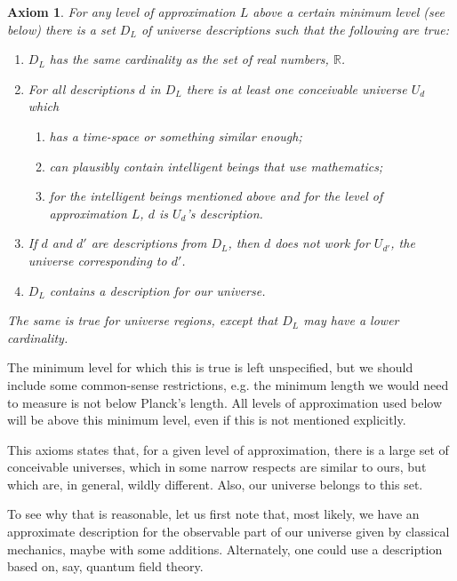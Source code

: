 \documentclass[a4paper
,draft
]{article}
\def\reale{\mathbb{R}}
\def\descriptions{D_L}
\newtheorem{axiom}{Axiom}
\begin{document}
\begin{axiom}\label{ax:uncountable}
  For any level of approximation $L$ above a certain minimum level (see below)
  there is a set $\descriptions$
  of universe descriptions such that the following are true:
  \begin{enumerate}
    \item $\descriptions$ has the same cardinality as
          the set of real numbers, $\reale$.
    \item For all descriptions $d$ in $\descriptions$
          there is at least one conceivable
          universe $U_d$ which
      \begin{enumerate}
        \item has a time-space or something similar enough;
        \item can plausibly contain intelligent beings that use mathematics;
        \item for the intelligent beings mentioned above and
              for the level of approximation $L$,
              $d$ is $U_d$'s description.
      \end{enumerate}
    \item If $d$ and $d'$ are descriptions from $\descriptions$,
          then $d$ does not work
          for $U_{d'}$, the universe corresponding to $d'$.
    \item $\descriptions$ contains a description for our universe.
  \end{enumerate}
  The same is true for universe regions, except that
  $\descriptions$ may have a lower
  cardinality.
\end{axiom}

The minimum level for which this is true is left unspecified, but we should
include some common-sense restrictions, e.g. the minimum length we would
need to measure is not below Planck's length.
All levels of approximation used below will be above this
minimum level, even if this is not mentioned explicitly.

This axioms states that, for a given level of approximation,
there is a large set of conceivable universes, which in some narrow respects
are similar to ours, but which are, in general, wildly different.
Also, our universe belongs to this set.

To see why that is reasonable, let us first note that,
most likely, we have an approximate description for the observable part
of our universe
given by classical mechanics, maybe with some additions.
Alternately, one could use a description based on, say, quantum field theory.
\end{document}
